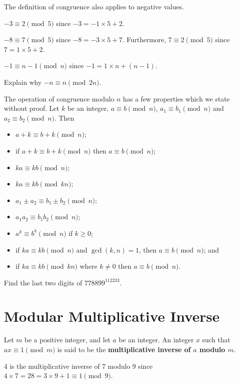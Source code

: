 The definition of congruence also applies to negative values.
\begin{example}
    $-3 \equiv 2 \pmod5$ since $-3 = -1\times5 + 2$.
\end{example}
\begin{example}
    $-8 \equiv 7 \pmod5$ since $-8 = -3\times5 + 7$. Furthermore, $7 \equiv 2 \pmod5$ since $7 = 1\times5 + 2$.
\end{example}
\begin{example}
    $-1 \equiv n-1 \pmod{n}$ since $-1 = 1\times n + (n-1)$.
\end{example}

\begin{exercise}
    Explain why $-n \equiv n \pmod{2n}$.
\end{exercise}

The operation of congruence modulo $n$ has a few properties which we state without proof. Let $k$ be an integer, $a \equiv b \pmod n$, $a_1 \equiv b_1 \pmod n$ and $a_2 \equiv b_2 \pmod n$. Then
\begin{itemize}
    \item $a + k \equiv b + k \pmod n$;
    \item if $a+k \equiv b+k \pmod n$ then $a \equiv b \pmod n$;
    \item $ka \equiv kb \pmod n$;
    \item $ka \equiv kb \pmod {kn}$;
    \item $a_1 \pm a_2 \equiv b_1 \pm b_2 \pmod n$;
    \item $a_1a_2 \equiv b_1b_2 \pmod n$;
    \item $a^k \equiv b^k \pmod n$ if $k \geq 0$;
    \item if $ka \equiv kb \pmod n$ and $\gcd(k, n) = 1$, then $a \equiv b \pmod n$; and
    \item if $ka \equiv kb \pmod{kn}$ where $k \neq 0$ then $a \equiv b \pmod n$.
\end{itemize}

\begin{exercise}
    Find the last two digits of $778899^{112233}$.
\end{exercise}

\newpage

\section{Modular Multiplicative Inverse}
\begin{definition}
    Let $m$ be a positive integer, and let $a$ be an integer. An integer $x$ such that $ax \equiv 1 \pmod m$ is said to be the \textbf{multiplicative inverse of $a$ modulo $m$}.
\end{definition}
\begin{example}
    4 is the multiplicative inverse of 7 modulo 9 since $4 \times 7 = 28 = 3 \times 9 + 1 \equiv 1 \pmod 9$.
\end{example}

